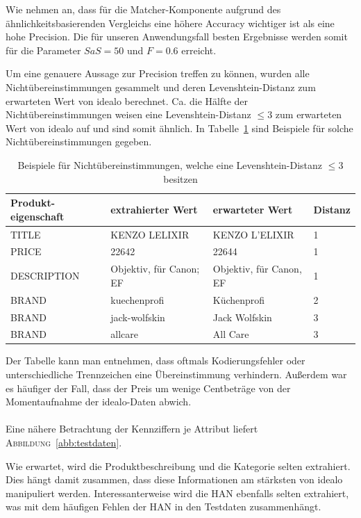 Wie nehmen an, dass für die Matcher-Komponente aufgrund des ähnlichkeitsbasierenden Vergleichs eine höhere Accuracy
wichtiger ist als eine hohe Precision.
Die für unseren Anwendungsfall besten Ergebnisse werden somit für die Parameter $SaS = 50$ und $F = 0.6$ erreicht.

\newpage
Um eine genauere Aussage zur Precision treffen zu können, wurden alle Nichtübereinstimmungen gesammelt und deren
Levenshtein-Distanz zum erwarteten Wert von idealo berechnet.
Ca. die Hälfte der Nichtübereinstimmungen weisen eine Levenshtein-Distanz $\leq 3$ zum erwarteten Wert von idealo
auf und sind somit ähnlich.
In Tabelle~\ref{tab:levenshtein-examples} sind Beispiele für solche Nichtübereinstimmungen gegeben.

\begin{table}[h]
    \centering
    \begin{tabular}{ p{2.5cm} | p{5cm} | p{5cm} | p{1cm}}
        \textbf{Produkt-eigenschaft} & \textbf{extrahierter Wert} & \textbf{erwarteter Wert} &
        \textbf{Distanz} \\
        \hline
        TITLE & KENZO LELIXIR & KENZO L'ELIXIR & 1\\
        PRICE & 22642 & 22644 & 1\\
        DESCRIPTION & Objektiv, für Canon; EF	& Objektiv, für Canon, EF & 1\\
        BRAND &	kuechenprofi & Küchenprofi & 2\\
        BRAND & jack-wolfskin & Jack Wolfskin & 3\\
        BRAND & allcare & All Care & 3
    \end{tabular}
    \caption{Beispiele für Nichtübereinstimmungen, welche eine Levenshtein-Distanz $\leq 3$ besitzen}
    \label{tab:levenshtein-examples}
    \vspace{-0.5cm}
\end{table}

Der Tabelle kann man entnehmen, dass oftmals Kodierungsfehler oder unterschiedliche Trennzeichen eine
Übereinstimmung verhindern.
Außerdem war es häufiger der Fall, dass der Preis um wenige Centbeträge von der Momentaufnahme der idealo-Daten
abwich.
\\
~\\
Eine nähere Betrachtung der Kennziffern je Attribut liefert \textsc{Abbildung}~\ref{abb:testdaten}.

Wie erwartet, wird die Produktbeschreibung und die Kategorie selten extrahiert.
Dies hängt damit zusammen, dass diese Informationen am stärksten von idealo manipuliert werden.
Interessanterweise wird die HAN ebenfalls selten extrahiert, was mit dem häufigen Fehlen der HAN in den
Testdaten zusammenhängt.

